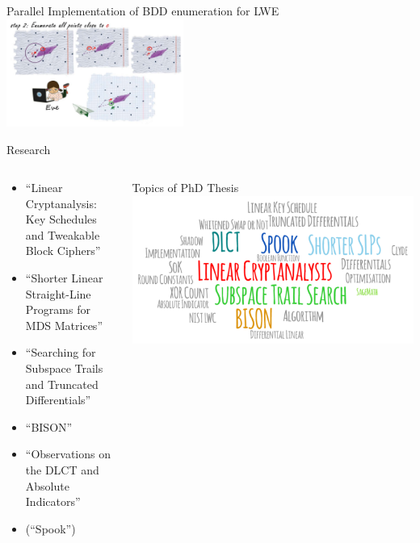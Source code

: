 \documentclass[%
    10pt,
    professionalfont,
    aspectratio=169,
    xcolor=dvipsnames, 
]{beamer}
\begin{document}
\begin{frame}{Parallel Implementation of BDD enumeration for LWE}
{    \includegraphics[height=100pt]{data/bdd-attack-step2-small.pdf}
    }
    \vfill
\end{frame}

\begin{frame}{Research}
    \begin{columns}
        \begin{column}{0.45\textwidth}
            \begin{itemize}
                \item \enquote{Linear Cryptanalysis: Key Schedules and Tweakable Block Ciphers}
                \item \enquote{Shorter Linear Straight-Line Programs for MDS Matrices}
                \item \enquote{Searching for Subspace Trails and Truncated Differentials}
                \item \enquote{BISON}
                \item \enquote{Observations on the DLCT and Absolute Indicators}\\[10pt]
                \item (\enquote{Spook})
            \end{itemize}
        \end{column}
        \begin{column}{0.45\textwidth}
            \begin{block}{Topics of PhD Thesis}
            \centering
            \includegraphics[width=\textwidth]{data/research-topics-thesis.png}
            \end{block}
        \end{column}
    \end{columns}
\end{frame}
\end{document}
